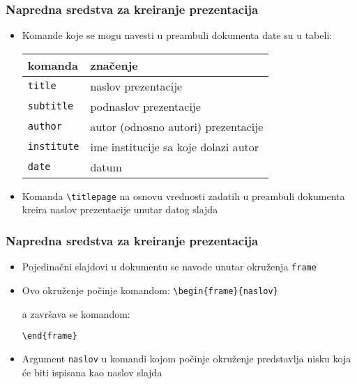 \documentclass{beamer}
\begin{document}
\begin{frame}[fragile]\frametitle{Napredna sredstva za kreiranje prezentacija}
	\begin{itemize}	
			\item	Komande koje se mogu navesti u preambuli dokumenta date su u tabeli:			
			\begin{tabular}{|l|l|}
				\hline	
				\footnotesize	komanda & \footnotesize značenje\\
				\hline
				\hline \footnotesize
				\footnotesize \verb"title" &\footnotesize naslov prezentacije \\
				\footnotesize \verb"subtitle" &\footnotesize podnaslov prezentacije \\
				\footnotesize \verb"author" &\footnotesize autor (odnosno autori) prezentacije \\
				\footnotesize \verb"institute" &\footnotesize ime institucije sa koje dolazi autor\\
				\footnotesize \verb"date"&\footnotesize datum\\
				\hline
			\end{tabular}
			\item Komanda \verb"\titlepage" na osnovu vrednosti zadatih u preambuli dokumenta kreira 
			naslov prezentacije unutar datog slajda
	\end{itemize}
\end{frame}

\begin{frame}[fragile]\frametitle{Napredna sredstva za kreiranje prezentacija}
	\begin{itemize}	
		\item Pojedinačni slajdovi u dokumentu se navode unutar okruženja \verb"frame"		
			\item Ovo okruženje počinje komandom:		
		\verb"\begin{frame}{naslov}"
			
			a završava se komandom:
			
			\verb"\end{frame}"		
		\item	Argument \verb"naslov" u komandi kojom počinje okruženje predstavlja nisku koja će
		biti ispisana kao naslov slajda
	\end{itemize}
\end{frame}
\end{document}
